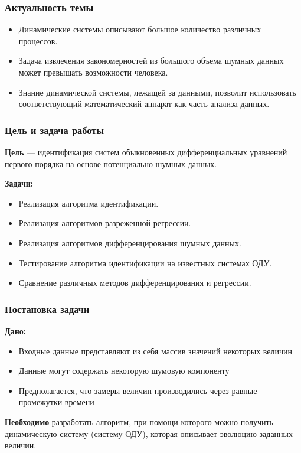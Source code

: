 \documentclass[pdf, hyperref={unicode}, aspectratio=169]{beamer}
\begin{document}
{
\frame{\titlepage}
}


\begin{frame}
\frametitle{Актуальность темы}

\begin{itemize}
  \item Динамические системы описывают большое количество различных процессов.
  \item Задача извлечения закономерностей из большого объема шумных данных может превышать возможности человека.
  \item Знание динамической системы, лежащей за данными, позволит использовать соответствующий математический аппарат как часть анализа данных.
\end{itemize}
\end{frame}


\begin{frame}
\frametitle{Цель и задача работы}

\textbf{Цель} --- идентификация систем обыкновенных дифференциальных уравнений первого порядка на основе потенциально шумных данных.

\textbf{Задачи:}
\begin{itemize}
  \item Реализация алгоритма идентификации.
  \item Реализация алгоритмов разреженной регрессии.
  \item Реализация алгоритмов дифференцирования шумных данных.
  \item Тестирование алгоритма идентификации на известных системах ОДУ.
  \item Сравнение различных методов дифференцирования и регрессии.
\end{itemize}
\end{frame}


\begin{frame}
\frametitle{Постановка задачи}

\textbf{Дано:}
\begin{itemize}
  \item Входные данные представляют из себя массив значений некоторых величин
  \item Данные могут содержать некоторую шумовую компоненту
  \item Предполагается, что замеры величин производились через равные промежутки времени
\end{itemize}

\textbf{Необходимо} разработать алгоритм, при помощи которого можно получить динамическую систему (систему ОДУ), которая описывает эволюцию заданных величин.
\end{frame}
\end{document}
